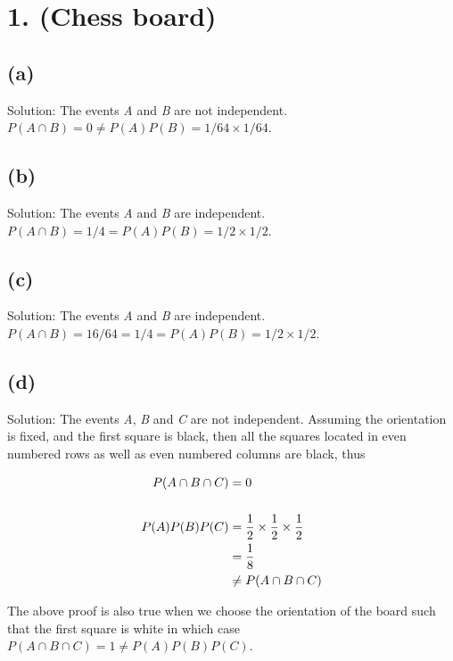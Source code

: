 \documentclass[10pt]{537homework}
\author{Peilun Dai}
\begin{document}
\section*{ 1. (Chess board) }

\subsection*{(a)} Solution: The events \textit{A} and \textit{B} are not independent. $P(A\cap B) = 0 \neq P(A)P(B) = 1/64 \times 1/64 $. 

\subsection*{(b)} Solution: The events \textit{A} and \textit{B} are independent. $P(A\cap B) = 1/4 =  P(A)P(B) = 1/2 \times 1/2 $.

\subsection*{(c)} Solution: The events \textit{A} and \textit{B} are independent. $P(A\cap B) = 16/64 = 1/4 = P(A)P(B) = 1/2 \times 1/2 $.

\subsection*{(d)} Solution: The events \textit{A}, \textit{B} and \textit{C} are not independent. Assuming the orientation is fixed, and the first square is black, then all the squares located in even numbered rows as well as even numbered columns are black, thus 

\begin{align} 
	P(A \cap B \cap C) & = 0 \nonumber  \\ \nonumber \\ 
	P(A)P(B)P(C) & = {1 \over 2} \times {1 \over 2} \times {1 \over 2} \nonumber \\
	& = {1 \over 8}\nonumber \\
	& \neq P(A \cap B \cap C) \nonumber 
\end{align}

The above proof is also true when we choose the orientation of the board such that the first square is white in which case $P(A \cap B \cap C)  = 1 \neq P(A)P(B)P(C)$.
\end{document}
